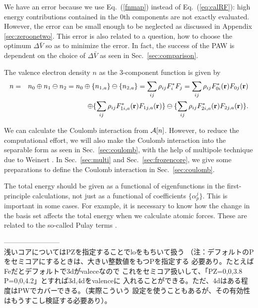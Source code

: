 \documentclass[a4paper,10pt,aip,onecolumn,amsmath,amssymb,floatfix,rmp]{revtex4-1}
\newcommand{\bfr}{{\bf r}}
\newcommand{\ooplus}{\oplus}
\newcommand{\oominus}{\ominus}
\def\calR{{\cal A}}
\newcommand{\req}[1]{\mbox{Eq.~\!(\ref{#1})}}
\newcommand{\refsec}[1]{\mbox{Sec.~\!\ref{#1}}}
\def\rhoij{\rho_{ij}}
\begin{document}
\begin{widetext}
We have an error because we use \req{fnmap} instead of \req{eq:calRF}:
high energy contributions contained in the 0th components are not
exactly evaluated. However, the error can be small enough to be
neglected as discussed in Appendix \ref{sec:zeroonetwo}.  This error is
also related to a question, how to choose the optimum $\Delta \bar{V}$
so as to minimize the error.  In fact, the success of the PAW \cite{PAW}
is dependent on the choice of $\Delta \bar{V}$ as seen in
\refsec{sec:comparison}.

The valence electron density $n$ as the 3-component function is given by
\begin{eqnarray}
n &=&n_0\ooplus n_1 \oominus n_2 = n_0 \ooplus \{n_{1,a}\} \oominus \{n_{2,a}\} =
\sum_{ij} \rhoij F_i^* F_j = \sum_{ij}
 \rhoij F^*_{0i}(\bfr)F_{0j}(\bfr) \nonumber \\
&&\ooplus  \{ \sum_{ij} \rhoij F^*_{1i,a}(\bfr)F_{1j,a}(\bfr) \}
\oominus   \{ \sum_{ij} \rhoij F^*_{2i,a}(\bfr)F_{2j,a}(\bfr) \}. \label{eq:n}
\end{eqnarray}
\end{widetext}
We can calculate the Coulomb interaction from $\calR[n]$. 
However, to reduce the computational effort, 
we will also make the Coulomb interaction into the separable form as
seen in \refsec{sec:coulomb}, with the help of multipole technique
due to Weinert \cite{weinert81}.
In \refsec{sec:multi} and \refsec{sec:frozencore}, we give some
preparations to define the Coulomb interaction in \refsec{sec:coulomb}.

The total energy should be given as a functional of eigenfunctions in
the first-principle calculations, not just as a functional of
coefficients $\{\alpha^j_p\}$.  This is important in some cases. For
example, it is necessary to know how the change in the basis set affects
the total energy when we calculate atomic forces. These are related to
the so-called Pulay terms \cite{pulay69}.

------------------------\\
浅いコアについてはPZを指定することでloをもちいて扱う
（注：デフォルトのPをセミコアにするときは、大きい整数値をもつPを指定する
必要あり。たとえばFeだとデフォルトで3dがvaleceなので
これをセミコア扱いして、「PZ=0,0,3.8 P=0,0,4.2」とすれば3d,4dをvalenceに
入れることができる。ただ、4dはある程度はPWでカバーできる。（実際こういう
設定を使うこともあるが、その有効性はもうすこし検証する必要あり）。
\end{document}
